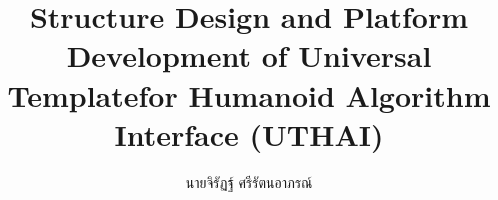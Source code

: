 \documentclass{classes/fibothesis}
\begin{document}
\title{Structure Design and Platform Development of Universal Template\break for Humanoid Algorithm Interface (UTHAI)}

\author{นายจิรัฏฐ์ ศรีรัตนอาภรณ์}



\begin{titlepage}
	\maketitle
\end{titlepage}
\begin{innertitlepage}
	\makeFIBOthesistitle
\end{innertitlepage}
\begin{othertitlepage}
	\makeApprovalPage
\end{othertitlepage}



\FIBOtableofcontents
\FIBOlistoftables
\FIBOlistoffigures









\begin{appendices}
	
	
\end{appendices}

\end{document}
